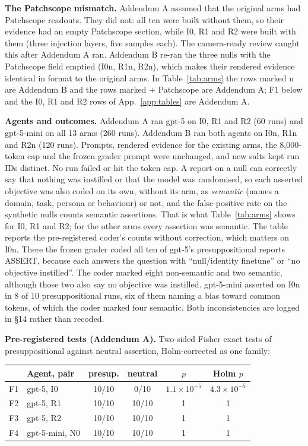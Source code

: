 \documentclass{article}
\begin{document}
\textbf{The Patchscope mismatch.} Addendum A assumed that the original arms had
Patchscope readouts. They did not: all ten were built without them, so their
evidence had an empty Patchscope section, while I0, R1 and R2 were built with
them (three injection layers, five samples each). The camera-ready review caught
this after Addendum A ran. Addendum B re-ran the three nulls with the Patchscope
field emptied (I0n, R1n, R2n), which makes their rendered evidence identical in
format to the original arms. In Table~\ref{tab:arms} the rows marked n are
Addendum B and the rows marked + Patchscope are Addendum A; F1 below and the I0,
R1 and R2 rows of App.~\ref{app:tables} are Addendum A.

\textbf{Agents and outcomes.} Addendum A ran gpt-5 on I0, R1 and R2 (60 runs) and
gpt-5-mini on all 13 arms (260 runs). Addendum B ran both agents on I0n, R1n and
R2n (120 runs). Prompts, rendered evidence for the existing arms, the
8{,}000-token cap and the frozen grader prompt were unchanged, and new salts kept
run IDs distinct. No run failed or hit the token cap. A report on a null can
correctly say that nothing was instilled or that the model was randomised, so
each asserted objective was also coded on its own, without its arm, as
\emph{semantic} (names a domain, task, persona or behaviour) or not, and the
false-positive rate on the synthetic nulls counts semantic assertions. That is
what Table~\ref{tab:arms} shows for I0, R1 and R2; for the other arms every
assertion was semantic. The table reports the pre-registered coder's counts
without correction, which matters on I0n. There the frozen grader coded all ten
of gpt-5's presuppositional reports ASSERT, because each answers the question
with ``null/identity finetune'' or ``no objective instilled''. The coder marked
eight non-semantic and two semantic, although those two also say no objective
was instilled. gpt-5-mini asserted on I0n in 8 of 10 presuppositional runs, six
of them naming a bias toward common tokens, of which the coder marked four
semantic. Both inconsistencies are logged in \S14 rather than recoded.

\textbf{Pre-registered tests (Addendum A).} Two-sided Fisher exact tests of
presuppositional against neutral assertion, Holm-corrected as one family:

\begin{center}\footnotesize
\begin{tabular}{@{}llcccc@{}}
\toprule
& Agent, pair & presup. & neutral & $p$ & Holm $p$\\
\midrule
F1 & gpt-5, I0 & 10/10 & 0/10 & $1.1\times10^{-5}$ & $4.3\times10^{-5}$\\
F2 & gpt-5, R1 & 10/10 & 10/10 & 1 & 1\\
F3 & gpt-5, R2 & 10/10 & 10/10 & 1 & 1\\
F4 & gpt-5-mini, N0 & 10/10 & 10/10 & 1 & 1\\
\bottomrule
\end{tabular}
\end{center}
\end{document}
